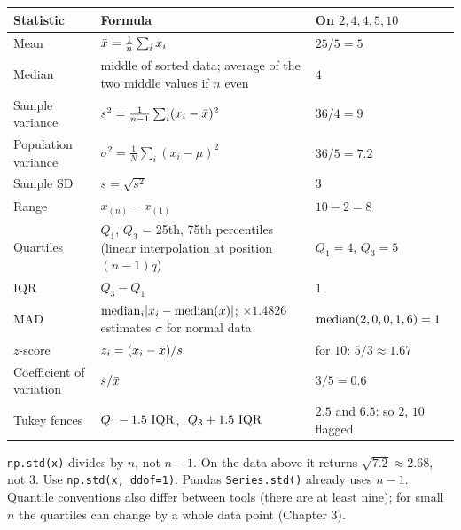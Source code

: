 \begin{center}
\small
\renewcommand{\arraystretch}{1.25}
\begin{tabular}{@{}p{3.3cm}p{6.6cm}p{4.4cm}@{}}
\toprule
Statistic & Formula & On $2,4,4,5,10$ \\
\midrule
Mean & $\bar{x} = \frac{1}{n}\sum_{i} x_i$ & $25/5 = 5$ \\
Median & middle of sorted data; average of the two middle values if $n$ even & $4$ \\
Sample variance & $s^2 = \frac{1}{n-1}\sum_i (x_i-\bar{x})^2$ & $36/4 = 9$ \\
Population variance & $\sigma^2 = \frac{1}{N}\sum_i (x_i-\mu)^2$ & $36/5 = 7.2$ \\
Sample SD & $s=\sqrt{s^2}$ & $3$ \\
Range & $x_{(n)}-x_{(1)}$ & $10-2=8$ \\
Quartiles & $Q_1$, $Q_3$ = 25th, 75th percentiles (linear interpolation at position $(n-1)q$) & $Q_1=4$, $Q_3=5$ \\
IQR & $Q_3-Q_1$ & $1$ \\
MAD & $\operatorname{median}_i \lvert x_i - \operatorname{median}(x)\rvert$; $\times 1.4826$ estimates $\sigma$ for normal data & $\operatorname{median}(2,0,0,1,6)=1$ \\
$z$-score & $z_i = (x_i-\bar{x})/s$ & for $10$: $5/3\approx 1.67$ \\
Coefficient of variation & $s/\bar{x}$ & $3/5=0.6$ \\
Tukey fences & $Q_1-1.5\,\operatorname{IQR}$, $\ Q_3+1.5\,\IQR$ & $2.5$ and $6.5$: so $2$, $10$ flagged \\
\bottomrule
\end{tabular}
\end{center}

\begin{trapbox}
\texttt{np.std(x)} divides by $n$, not $n-1$. On the data above it returns $\sqrt{7.2}\approx 2.68$, not $3$. Use \texttt{np.std(x, ddof=1)}. Pandas \texttt{Series.std()} already uses $n-1$. Quantile conventions also differ between tools (there are at least nine); for small $n$ the quartiles can change by a whole data point (Chapter 3).
\end{trapbox}

